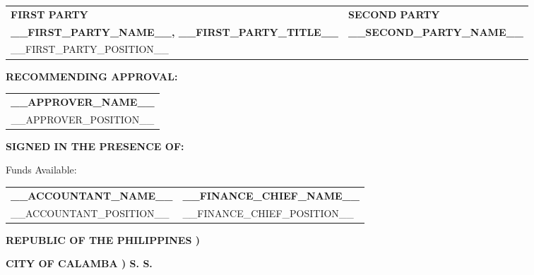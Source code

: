 \documentclass[11pt]{article}
\newcommand{\party}[1]{\textbf{\MakeUppercase{#1}}}
\begin{document}
\vspace{18pt}

\noindent
\begin{tabular}{p{2.8in}p{2.8in}}
\centering \party{FIRST PARTY} & \centering \party{SECOND PARTY} \tabularnewline[36pt]
\centering \textbf{__FIRST_PARTY_NAME__, __FIRST_PARTY_TITLE__} &
\centering \textbf{__SECOND_PARTY_NAME__} \tabularnewline
\centering __FIRST_PARTY_POSITION__ &
\tabularnewline
\end{tabular}

\vspace{18pt}

\begin{center}
\textbf{RECOMMENDING APPROVAL:}
\end{center}

\vspace{8pt}

\noindent
\begin{center}
\begin{tabular}{c}
\textbf{__APPROVER_NAME__} \\
__APPROVER_POSITION__
\end{tabular}
\end{center}

\vspace{6pt}

\begin{center}
\textbf{SIGNED IN THE PRESENCE OF:}
\end{center}

\vspace{12pt}

\begin{center}
Funds Available:
\end{center}

\vspace{24pt}

\noindent
\begin{tabular}{p{2.8in}p{2.8in}}
\centering \textbf{__ACCOUNTANT_NAME__} &
\centering \textbf{__FINANCE_CHIEF_NAME__} \tabularnewline
\centering __ACCOUNTANT_POSITION__ &
\centering __FINANCE_CHIEF_POSITION__
\end{tabular}

\vspace{18pt}

\noindent
\textbf{REPUBLIC OF THE PHILIPPINES )}

\noindent
\textbf{CITY OF CALAMBA \hspace{0.5in} ) S. S.}
\end{document}
